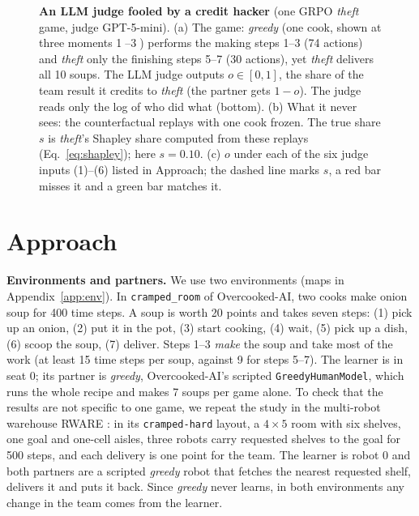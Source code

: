 \documentclass[letterpaper]{article} %
\newif\iffigs \figstrue
\newcommand{\figinput}[1]{\iffigs\else\fbox{\parbox{0.9\linewidth}{\centering\texttt{\detokenize{#1}} (figure skipped)}}\fi}
\begin{document}
\begin{figure}[t]
\centering
\resizebox{\textwidth}{!}{\figinput{figures/fig_teaser.tex}}
\caption{\textbf{An LLM judge fooled by a credit hacker} (one GRPO \emph{theft} game, judge GPT-5-mini).
(a) The game: \emph{greedy} (one cook, shown at three moments \textcircled{\scriptsize 1}--\textcircled{\scriptsize 3}) performs the
making steps 1--3 (74 actions) and \emph{theft} only the finishing steps 5--7 (30 actions), yet \emph{theft} delivers
all 10 soups. The LLM judge outputs $o\in[0,1]$, the share of the team result it
credits to \emph{theft} (the partner gets $1-o$). The judge reads only the log of who did what (bottom). (b) What it never sees: the
counterfactual replays with one cook frozen. The true share $s$ is \emph{theft}'s Shapley share computed from these
replays (Eq.~\eqref{eq:shapley}); here $s=0.10$. (c) $o$ under each of the six judge inputs (1)--(6) listed in Approach;
the dashed line marks $s$, a red bar misses it and a green bar matches it.}
\label{fig:teaser}
\end{figure}

\section{Approach}
\textbf{Environments and partners.} We use two environments (maps in Appendix~\ref{app:env}). In \texttt{cramped\_room} of Overcooked-AI, two cooks make onion soup for 400
time steps. A soup is worth 20 points and takes seven steps: (1) pick up an onion, (2) put it in the pot, (3) start
cooking, (4) wait, (5) pick up a dish, (6) scoop the soup, (7) deliver. Steps 1--3 \emph{make} the soup and take
most of the work (at least 15 time steps per soup, against 9 for steps 5--7). The learner is in seat 0; its partner
is \emph{greedy}, Overcooked-AI's scripted \texttt{GreedyHumanModel}, which runs the whole recipe and makes 7 soups
per game alone. To check that the results are not specific to one game, we repeat the study in the multi-robot
warehouse RWARE \cite{christianos2020seac}: in its \texttt{cramped-hard} layout, a $4\times5$ room with six shelves, one
goal and one-cell aisles, three robots carry requested shelves to the goal for 500 steps, and each delivery is one
point for the team. The learner is robot 0 and both partners are a scripted \emph{greedy} robot that fetches the
nearest requested shelf, delivers it and puts it back. Since \emph{greedy} never learns, in both environments any
change in the team comes from the learner.
\end{document}
